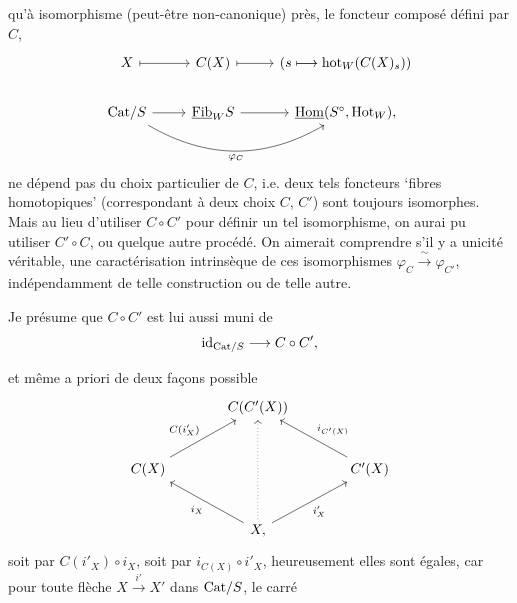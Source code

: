 qu'à isomorphisme (peut-être non-canonique) près, le foncteur composé défini par $C$,
\[
\begin{tikzcd}
X \arrow[r, mapsto] & C(X) \arrow[r, mapsto] & (s \longmapsto \mathrm{hot}_W(C(X)_s)) \\
\Cat/S \arrow[r] \arrow[rr, bend right, "\varphi_C"'] & \Fib_W S \arrow[r] & \Hom(S^\circ,\mathrm{Hot}_W),
\end{tikzcd}
\]
ne dépend pas du choix particulier de $C$, i.e. deux tels foncteurs `fibres homotopiques' (correspondant à deux choix $C$, $C'$) sont toujours isomorphes. Mais au lieu d'utiliser $C \circ C'$ pour définir un tel isomorphisme, on aurai pu utiliser $C' \circ C$, ou quelque autre procédé. On aimerait comprendre s'il y a unicité véritable, une caractérisation intrinsèque de ces isomorphismes $\varphi_C \xrightarrow{\ \sim\ } \varphi_{C'}$, indépendamment de telle construction ou de telle autre. %

Je présume que $C \circ C'$ est lui aussi muni de
\[
\mathrm{id}_{\mathrm{Cat}/S} \longrightarrow C \circ C',
\]

et même a priori de deux façons possible
\[
\begin{tikzcd}[column sep=large, row sep=large]
& C(C'(X)) & \\
C(X) \arrow[ur, "C(i'_X)"] & & C'(X) \arrow[ul, "i_{C'(X)}"'] \\
& X, \arrow[ul, "i_X"] \arrow[ur, "i'_X"'] \arrow[uu, dotted] &
\end{tikzcd}
\]
soit par $C(i'_X) \circ i_X$, soit par $i_{C(X)} \circ i'_X$, heureusement elles sont égales, car pour toute flèche $X \xrightarrow{\ i'\ } X'$ dans $\mathrm{Cat}/S$, le carré %

